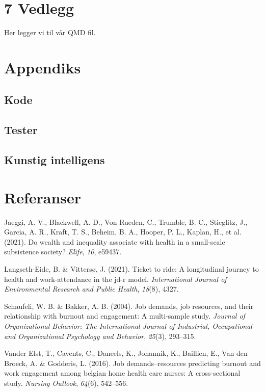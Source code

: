 \documentclass[
  12pt,
  a4paper,
  DIV=11,
  numbers=noendperiod]{scrartcl}
\newlength{\cslhangindent}
\newenvironment{CSLReferences}[2] %
 {\begin{list}{}{%
  \setlength{\itemindent}{0pt}
  \setlength{\leftmargin}{0pt}
  \setlength{\parsep}{0pt}
  \ifodd #1
   \setlength{\leftmargin}{\cslhangindent}
   \setlength{\itemindent}{-1\cslhangindent}
  \fi
  \setlength{\itemsep}{#2\baselineskip}}}
 {\end{list}}
\begin{document}
\newpage

\section{7 Vedlegg}\label{vedlegg}

Her legger vi til vår QMD fil.

\section{Appendiks}\label{appendiks}

\subsection{Kode}\label{kode}

\subsection{Tester}\label{tester}

\subsection{Kunstig intelligens}\label{kunstig-intelligens}

\newpage

\clearpage

\section{Referanser}\label{referanser}

\label{refs}
\begin{CSLReferences}{1}{0}
Jaeggi, A. V., Blackwell, A. D., Von Rueden, C., Trumble, B. C.,
Stieglitz, J., Garcia, A. R., Kraft, T. S., Beheim, B. A., Hooper, P.
L., Kaplan, H., et al. (2021). Do wealth and inequality associate with
health in a small-scale subsistence society? \emph{Elife}, \emph{10},
e59437.

Langseth-Eide, B. \& Vittersø, J. (2021). Ticket to ride: A longitudinal
journey to health and work-attendance in the jd-r model.
\emph{International Journal of Environmental Research and Public
Health}, \emph{18}(8), 4327.

Schaufeli, W. B. \& Bakker, A. B. (2004). Job demands, job resources,
and their relationship with burnout and engagement: A multi-sample
study. \emph{Journal of Organizational Behavior: The International
Journal of Industrial, Occupational and Organizational Psychology and
Behavior}, \emph{25}(3), 293--315.

Vander Elst, T., Cavents, C., Daneels, K., Johannik, K., Baillien, E.,
Van den Broeck, A. \& Godderis, L. (2016). Job demands--resources
predicting burnout and work engagement among belgian home health care
nurses: A cross-sectional study. \emph{Nursing Outlook}, \emph{64}(6),
542--556.

\end{CSLReferences}
\end{document}

